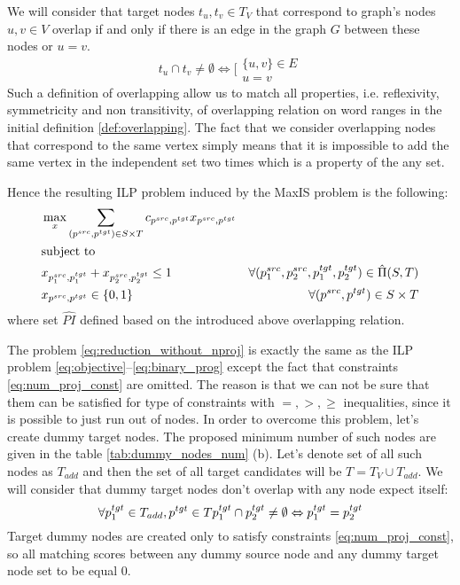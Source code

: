 We will consider that target nodes \( t_u, t_v \in T_{V} \) that correspond to graph's nodes \( u, v \in V \) overlap
if and only if there is an edge in the graph \( G \) between these nodes or \( u = v \).
\[
    t_u \cap t_v \neq \emptyset \Leftrightarrow
    \Biggl[
    \begin{array}{l}
        \{ u, v \} \in E \\
        u = v
    \end{array}
\]
Such a definition of overlapping allow us to match all properties, i.e. reflexivity, symmetricity and non transitivity,
of overlapping relation on word ranges in the initial definition \ref{def:overlapping}. The fact that we consider
overlapping nodes that correspond to the same vertex simply means that it is impossible to
add the same vertex in the independent set two times which is a property of the any set.

Hence the resulting ILP problem induced by the MaxIS problem is the following:
\begin{equation} \label{eq:reduction_without_nproj}
    \begin{aligned}
         & \max\limits_x \sum\limits_{(p^{src}, p^{tgt}) \in S \times T} c_{p^{src}, p^{tgt}} x_{p^{src}, p^{tgt}}                                             \\
         & \text{subject to}                                                                                                                                   \\
         & x_{p_1^{src}, p_1^{tgt}} + x_{p_2^{src}, p_2^{tgt}} \leq 1
         & \forall (p_1^{src}, p_2^{src}, p_1^{tgt}, p_2^{tgt}) \in \hat{\Pi}(S, T)                                                                            \\
         & x_{p^{src}, p^{tgt}} \in \{ 0, 1 \}                                                                     & \forall (p^{src}, p^{tgt}) \in S \times T
    \end{aligned}
\end{equation}
where set \( \hat{PI} \) defined based on the introduced above overlapping relation.

The problem \eqref{eq:reduction_without_nproj} is exactly the same as the ILP problem \eqref{eq:objective}--\eqref{eq:binary_prog}
except the fact that constraints \eqref{eq:num_proj_const} are omitted. The reason is that we can not be sure
that them can be satisfied for type of constraints with \( =, >, \geq \) inequalities, since it is possible to just run out of nodes.
In order to overcome this problem, let's create dummy target nodes. The proposed minimum number of such nodes are given
in the table \ref{tab:dummy_nodes_num} (b). Let's denote set of all such nodes as \( T_{add} \) and then the set of all target candidates
will be \( T = T_V \cup T_{add} \). We will consider that dummy target nodes don't overlap with any node expect itself:
\[
    \forall p_1^{tgt} \in T_{add}, p^{tgt} \in T
    p_1^{tgt} \cap p_2^{tgt} \neq \emptyset \Leftrightarrow p_1^{tgt} = p_2^{tgt}
\]
Target dummy nodes are created only to satisfy constraints \eqref{eq:num_proj_const}, so all matching scores
between any dummy source node and any dummy target node set to be equal \( 0 \).

